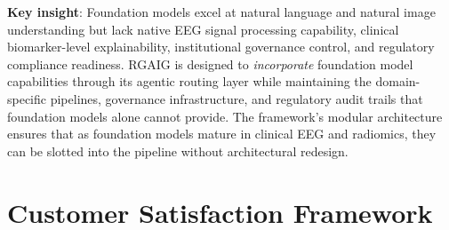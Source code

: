 \noindent \textbf{Key insight}: Foundation models excel at natural language and natural image understanding but lack native EEG signal processing capability, clinical biomarker-level explainability, institutional governance control, and regulatory compliance readiness. RGAIG is designed to \textit{incorporate} foundation model capabilities through its agentic routing layer while maintaining the domain-specific pipelines, governance infrastructure, and regulatory audit trails that foundation models alone cannot provide. The framework's modular architecture ensures that as foundation models mature in clinical EEG and radiomics, they can be slotted into the pipeline without architectural redesign.


\section{Customer Satisfaction Framework}
\label{sec:dt_customer_satisfaction}

